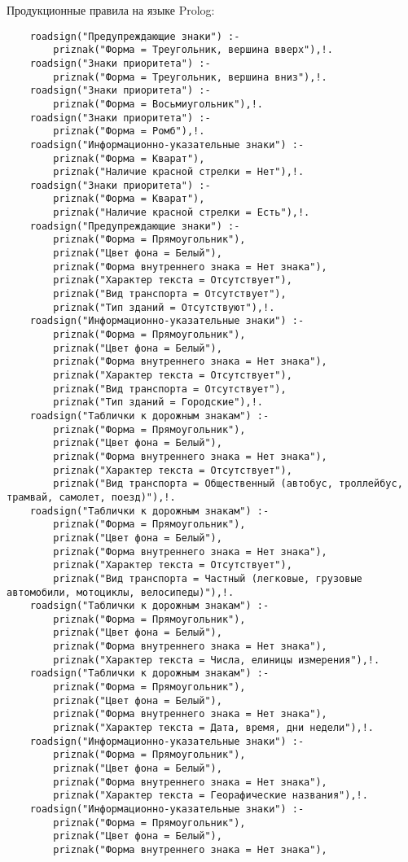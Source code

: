 Продукционные правила на языке Prolog:
\begin{verbatim}
	roadsign("Предупреждающие знаки") :-
		priznak("Форма = Треугольник, вершина вверх"),!.
	roadsign("Знаки приоритета") :-
		priznak("Форма = Треугольник, вершина вниз"),!.
	roadsign("Знаки приоритета") :-
		priznak("Форма = Восьмиугольник"),!.
	roadsign("Знаки приоритета") :-
		priznak("Форма = Ромб"),!.
	roadsign("Информационно-указательные знаки") :-
		priznak("Форма = Кварат"),
		priznak("Наличие красной стрелки = Нет"),!.
	roadsign("Знаки приоритета") :-
		priznak("Форма = Кварат"),
		priznak("Наличие красной стрелки = Есть"),!.
	roadsign("Предупреждающие знаки") :-
		priznak("Форма = Прямоугольник"),
		priznak("Цвет фона = Белый"),
		priznak("Форма внутреннего знака = Нет знака"),
		priznak("Характер текста = Отсутствует"),
		priznak("Вид транспорта = Отсутствует"),
		priznak("Тип зданий = Отсутствуют"),!.
	roadsign("Информационно-указательные знаки") :-
		priznak("Форма = Прямоугольник"),
		priznak("Цвет фона = Белый"),
		priznak("Форма внутреннего знака = Нет знака"),
		priznak("Характер текста = Отсутствует"),
		priznak("Вид транспорта = Отсутствует"),
		priznak("Тип зданий = Городские"),!.
	roadsign("Таблички к дорожным знакам") :-
		priznak("Форма = Прямоугольник"),
		priznak("Цвет фона = Белый"),
		priznak("Форма внутреннего знака = Нет знака"),
		priznak("Характер текста = Отсутствует"),
		priznak("Вид транспорта = Общественный (автобус, троллейбус, трамвай, самолет, поезд)"),!.
	roadsign("Таблички к дорожным знакам") :-
		priznak("Форма = Прямоугольник"),
		priznak("Цвет фона = Белый"),
		priznak("Форма внутреннего знака = Нет знака"),
		priznak("Характер текста = Отсутствует"),
		priznak("Вид транспорта = Частный (легковые, грузовые автомобили, мотоциклы, велосипеды)"),!.
	roadsign("Таблички к дорожным знакам") :-
		priznak("Форма = Прямоугольник"),
		priznak("Цвет фона = Белый"),
		priznak("Форма внутреннего знака = Нет знака"),
		priznak("Характер текста = Числа, елиницы измерения"),!.
	roadsign("Таблички к дорожным знакам") :-
		priznak("Форма = Прямоугольник"),
		priznak("Цвет фона = Белый"),
		priznak("Форма внутреннего знака = Нет знака"),
		priznak("Характер текста = Дата, время, дни недели"),!.
	roadsign("Информационно-указательные знаки") :-
		priznak("Форма = Прямоугольник"),
		priznak("Цвет фона = Белый"),
		priznak("Форма внутреннего знака = Нет знака"),
		priznak("Характер текста = Георафические названия"),!.
	roadsign("Информационно-указательные знаки") :-
		priznak("Форма = Прямоугольник"),
		priznak("Цвет фона = Белый"),
		priznak("Форма внутреннего знака = Нет знака"),

\end{verbatim}
